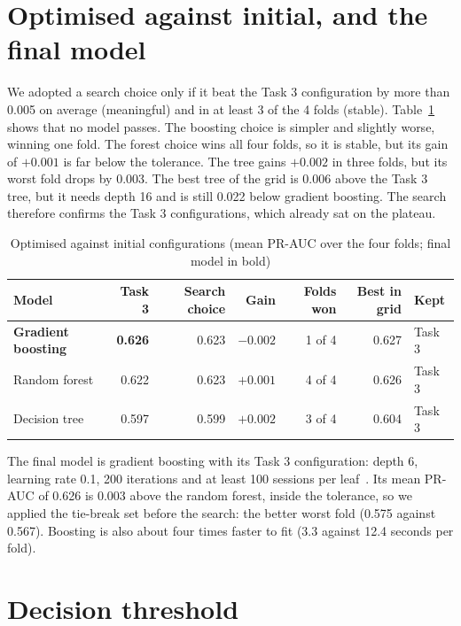 \documentclass[12pt,a4paper,openany]{report}
\begin{document}
\section{Optimised against initial, and the final model}\label{sec:optim-verdict}

We adopted a search choice only if it beat the Task 3 configuration by more than 0.005 on average
(meaningful) and in at least 3 of the 4 folds (stable). Table~\ref{tab:optim-verdict} shows that no model passes.
The boosting choice is simpler and slightly worse, winning one fold. The forest choice wins all four folds, so it is
stable, but its gain of $+0.001$ is far below the tolerance. The tree gains $+0.002$ in three folds, but its worst fold
drops by 0.003. The best tree of the grid is 0.006 above the Task 3 tree, but it needs depth 16 and is still
0.022 below gradient boosting. The search therefore confirms the Task 3 configurations, which already sat on the plateau.

\begin{table}[!htb]
  \centering\small
  \caption{Optimised against initial configurations (mean \acs{PR-AUC} over the four folds; final model in bold)}
  \label{tab:optim-verdict}
  \begin{tabular*}{\textwidth}{@{\extracolsep{\fill}}lrrrrrl}
    \toprule
    Model & Task 3 & Search choice & Gain & Folds won & Best in grid & Kept \\
    \midrule
    \textbf{Gradient boosting} & \textbf{0.626} & 0.623 & $-0.002$ & 1 of 4 & 0.627 & Task 3 \\
    Random forest              & 0.622 & 0.623 & $+0.001$ & 4 of 4 & 0.626 & Task 3 \\
    Decision tree              & 0.597 & 0.599 & $+0.002$ & 3 of 4 & 0.604 & Task 3 \\
    \bottomrule
  \end{tabular*}
\end{table}

The final model is gradient boosting with its Task 3 configuration: depth 6, learning rate 0.1, 200 iterations
and at least 100 sessions per leaf~\cite{friedman2001}. Its mean \acs{PR-AUC} of 0.626 is 0.003 above the random
forest, inside the tolerance, so we applied the tie-break set before the search: the better worst fold (0.575 against
0.567). Boosting is also about four times faster to fit (3.3 against 12.4 seconds per fold).

\section{Decision threshold}\label{sec:optim-threshold}
\end{document}
